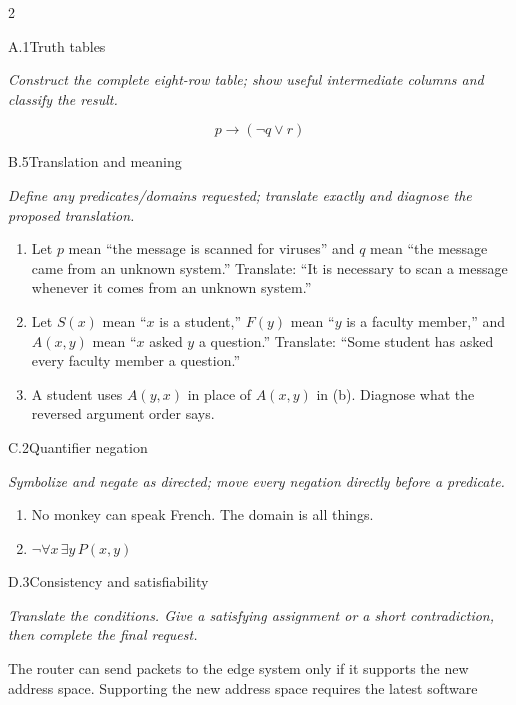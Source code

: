 \documentclass[9pt]{extarticle}
\begin{document}
\CoreWorkArea
\FormBreak
{}
\begin{multicols}{2}
\begin{CoreProblem}{A.1}{Truth tables}
{\scriptsize\textit{Construct the complete eight-row table; show useful intermediate columns and classify the result.}\par}
\[
  p\to(\neg q\lor r)
\]
\end{CoreProblem}
\begin{CoreProblem}{B.5}{Translation and meaning}
{\scriptsize\textit{Define any predicates/domains requested; translate exactly and diagnose the proposed translation.}\par}
\begin{enumerate}[label=(\alph*)]
  \item Let $p$ mean ``the message is scanned for viruses'' and $q$ mean ``the
        message came from an unknown system.'' Translate: ``It is necessary to
        scan a message whenever it comes from an unknown system.''
  \item Let $S(x)$ mean ``$x$ is a student,'' $F(y)$ mean ``$y$ is a faculty
        member,'' and $A(x,y)$ mean ``$x$ asked $y$ a question.'' Translate:
        ``Some student has asked every faculty member a question.''
  \item A student uses $A(y,x)$ in place of $A(x,y)$ in (b). Diagnose what the
        reversed argument order says.
\end{enumerate}
\end{CoreProblem}
\begin{CoreProblem}{C.2}{Quantifier negation}
{\scriptsize\textit{Symbolize and negate as directed; move every negation directly before a predicate.}\par}
\begin{enumerate}[label=(\alph*)]
  \item No monkey can speak French. The domain is all things.
  \item $\neg\forall x\,\exists y\,P(x,y)$
\end{enumerate}
\end{CoreProblem}
\columnbreak
\begin{CoreProblem}{D.3}{Consistency and satisfiability}
{\scriptsize\textit{Translate the conditions. Give a satisfying assignment or a short contradiction, then complete the final request.}\par}
The router can send packets to the edge system only if it supports the new
address space. Supporting the new address space requires the latest software

\end{CoreProblem}
\end{multicols}
\end{document}
